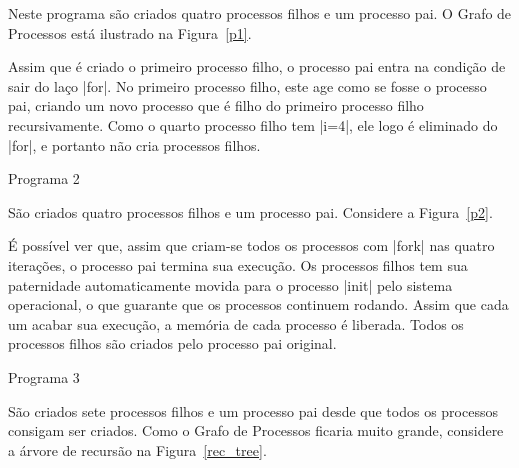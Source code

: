 \documentclass{amsart}
\makeatletter
\def\subsection{\@startsection{subsection}{3}%
  \z@{.5\linespacing\@plus.7\linespacing}{.1\linespacing}%
  {\normalfont\itshape}}
\theoremstyle{plain}
\makeatother
\begin{document}
Neste programa são criados quatro processos filhos e um processo pai. O Grafo de Processos está
ilustrado na Figura~\ref{p1}.

Assim que é criado o primeiro processo filho, o processo pai entra na condição de sair do laço
|for|. No primeiro processo filho, este age como se fosse o processo pai, criando um novo processo
que é filho do primeiro processo filho recursivamente. Como o quarto processo filho tem |i=4|, ele
logo é eliminado do |for|, e portanto não cria processos filhos.

\subsection{Programa 2}

São criados quatro processos filhos e um processo pai. Considere a Figura~\ref{p2}.

É possível ver que, assim que criam-se todos os processos com |fork| nas quatro
iterações, o processo pai termina sua execução. Os processos filhos tem sua paternidade
automaticamente movida para o processo |init| pelo sistema operacional, o que guarante
que os processos continuem rodando. Assim que cada um acabar sua execução, a memória de cada
processo é liberada. Todos os processos filhos são criados pelo processo pai original.

\subsection{Programa 3}

São criados sete processos filhos e um processo pai desde que todos os processos consigam ser
criados. Como o Grafo de Processos ficaria muito grande, considere a árvore de recursão na
Figura~\ref{rec_tree}.

\begin{figure}[h]
\end{figure}
\end{document}
